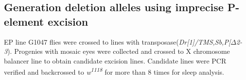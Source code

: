 \subsection*{Generation deletion alleles using imprecise P-element excision}

EP line G1047 flies were crossed to lines with transposase(\emph{Dr[1]/TMS,Sb,P[$\Delta$2-3}). Progenies with mosaic eyes were collected and crossed to X chromosome balancer line to obtain candidate excision lines. Candidate lines were PCR verified and backcrossed to \emph{w\textsuperscript{1118}} for more than 8 times for sleep analysis.
